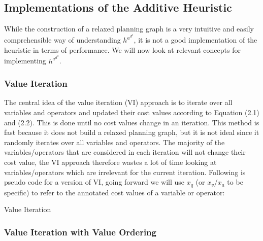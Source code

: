 \subsection{Implementations of the Additive Heuristic}
While the construction of a relaxed planning graph is a very intuitive and easily comprehensible way of understanding $h^a^d^d$, it is not a good implementation of the heuristic in terms of performance. We will now look at relevant concepts for implementing $h^a^d^d$.

\subsubsection{Value Iteration}

The central idea of the value iteration (VI) approach is to iterate over all variables and operators and updated their cost values according to Equation (2.1) and (2.2). This is done until no cost values change in an iteration. This method is fast because it does not build a relaxed planning graph, but it is not ideal since it randomly iterates over all variables and operators. The majority of the variables/operators that are considered in each iteration will not change their cost value, the VI approach therefore wastes a lot of time looking at variables/operators which are irrelevant for the current iteration. Following is pseudo code for a version of VI, going forward we will use $x_q$ (or $x_v$/$x_a$ to be specific) to refer to the annotated cost values of a variable or operator:\\

\begin{algorithm*}[H]
 \caption{Value Iteration}
\end{algorithm*}

\subsubsection{Value Iteration with Value Ordering}

